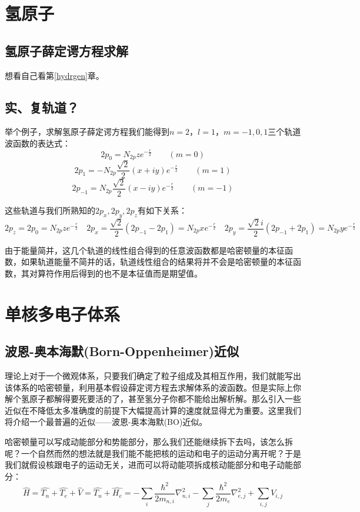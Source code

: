 \section{氢原子}
\subsection{氢原子薛定谔方程求解}
想看自己看第\ref{hydrgen}章。

\subsection{实、复轨道？}
举个例子，求解氢原子薛定谔方程我们能得到$n=2$，$l=1$，$m=-1,0,1$三个轨道波函数的表达式：
\[2p_0=N_{2p}ze^{-\frac{r}{2}} \qquad (m=0)\]
\[2p_1=-N_{2p}\frac{\sqrt{2}}{2}(x+iy)e^{-\frac{r}{2}} \qquad (m=1) \]
\[2p_{-1}=N_{2p}\frac{\sqrt{2}}{2}(x-iy)e^{-\frac{r}{2}} \qquad (m=-1) \]

这些轨道与我们所熟知的$2p_x,2p_y,2p_z$有如下关系：
\[2p_z=2p_0=N_{2p}ze^{-\frac{r}{2}} \quad 2p_x=\frac{\sqrt{2}}{2}(2p_{-1}-2p_1)=N_{2p}xe^{-\frac{r}{2}} \quad 2p_y=\frac{\sqrt{2}i}{2}(2p_{-1}+2p_1)=N_{2p}ye^{-\frac{r}{2}}\]

由于能量简并，这几个轨道的线性组合得到的任意波函数都是哈密顿量的本征函数，如果轨道能量不简并的话，轨道线性组合的结果将并不会是哈密顿量的本征函数，其对算符作用后得到的也不是本征值而是期望值。

\section{单核多电子体系}
\subsection{波恩-奥本海默(Born-Oppenheimer)近似}
理论上对于一个微观体系，只要我们确定了粒子组成及其相互作用，我们就能写出该体系的哈密顿量，利用基本假设薛定谔方程去求解体系的波函数。但是实际上你解个氢原子都解得要死要活的了，甚至氢分子你都不能给出解析解。那么引入一些近似在不降低太多准确度的前提下大幅提高计算的速度就显得尤为重要。这里我们将介绍一个最普遍的近似——波恩-奥本海默(BO)近似。

哈密顿量可以写成动能部分和势能部分，那么我们还能继续拆下去吗，该怎么拆呢？一个自然而然的想法就是我们能不能把核的运动和电子的运动分离开呢？于是我们就假设核跟电子的运动无关，进而可以将动能项拆成核动能部分和电子动能部分：
\[\hat{H}=\hat{T_n}+\hat{T_e}+\hat{V}=\hat{T_n}+\hat{H_e}=-\sum_i\frac{\hbar^2}{2m_{n,i}}\nabla^2_{n,i}-\sum_j\frac{\hbar^2}{2m_e}\nabla^2_{e,j}+\sum_{i,j}V_{i,j}\]

